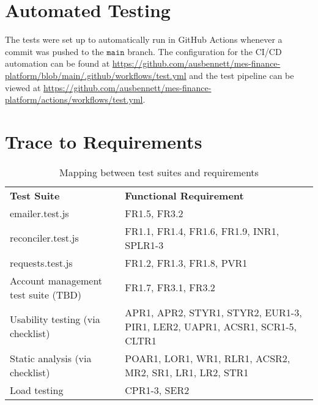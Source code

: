 \documentclass[12pt, titlepage]{article}
\begin{document}
\section{Automated Testing}

The tests were set up to automatically run in GitHub Actions whenever a commit was pushed to the $\mathtt{main}$ branch.
The configuration for the CI/CD automation can be found at \url{https://github.com/ausbennett/mes-finance-platform/blob/main/.github/workflows/test.yml}
and the test pipeline can be viewed at \url{https://github.com/ausbennett/mes-finance-platform/actions/workflows/test.yml}.

\newpage

\section{Trace to Requirements}
\begin{table}[!h]
\begin{table}[H]
\begin{tabularx}{\textwidth}{p{5cm}p{5cm}}
\toprule {\bf Test Suite} & {\bf Functional Requirement}\\
  emailer.test.js & FR1.5, FR3.2\\
  reconciler.test.js & FR1.1, FR1.4, FR1.6, FR1.9, INR1, SPLR1-3\\
  requests.test.js & FR1.2, FR1.3, FR1.8, PVR1\\ 
  Account management test suite (TBD) & FR1.7, FR3.1, FR3.2\\
  Usability testing (via checklist) & APR1, APR2, STYR1, STYR2, EUR1-3, PIR1, LER2, UAPR1, ACSR1, SCR1-5, CLTR1\\
  Static analysis (via checklist) & POAR1, LOR1, WR1, RLR1, ACSR2, MR2, SR1, LR1, LR2, STR1\\
  Load testing & CPR1-3, SER2\\
\end{tabularx}
\caption{Mapping between test suites and requirements}
\end{table}
\end{table}

\newpage
\end{document}

